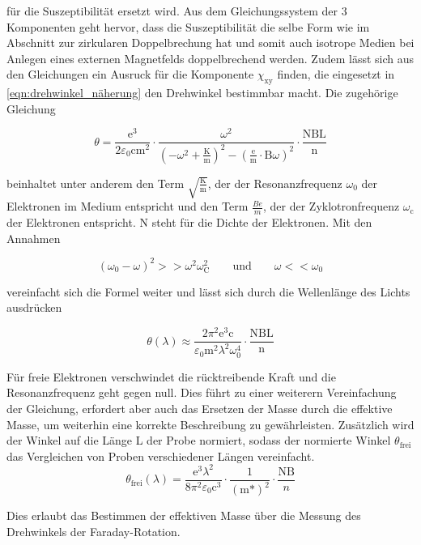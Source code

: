         für die Suszeptibilität ersetzt wird. Aus dem Gleichungssystem der 3 Komponenten geht hervor, dass die Suszeptibilität die selbe Form wie im Abschnitt zur zirkularen Doppelbrechung hat und somit auch 
        isotrope Medien bei Anlegen eines externen Magnetfelds doppelbrechend werden. Zudem lässt sich aus den Gleichungen ein Ausruck für die Komponente $\chi_{\text{xy}}$ finden, die eingesetzt in 
        \ref{eqn:drehwinkel_näherung} den Drehwinkel bestimmbar macht. Die zugehörige Gleichung

        \begin{equation*}
            \theta = \frac{\text{e}^3}{2\varepsilon_0\text{cm}^2} \cdot \frac{\omega^2}{\left(-\omega^2 + \frac{\text{K}}{\text{m}}\right)^2 - \left(\frac{\text{e}}{\text{m}} \cdot \text{B} \omega\right)^2} \cdot \frac{\text{NBL}}{\text{n}}
        \end{equation*}

        beinhaltet unter anderem den Term $\sqrt{\frac{\text{K}}{\text{m}}}$, der der Resonanzfrequenz $\omega_0$ der Elektronen im Medium entspricht und den Term $\frac{Be}{m}$, der der Zyklotronfrequenz 
        $\omega_{\text{c}}$ der Elektronen entspricht. N steht für die Dichte der Elektronen. Mit den Annahmen
        
        \begin{equation*}
            \left(\omega_0 - \omega\right)^2 >> \omega^2 \omega_{\text{C}}^2 \qquad \text{und} \qquad \omega << \omega_0
        \end{equation*}

        vereinfacht sich die Formel weiter und lässt sich durch die Wellenlänge des Lichts ausdrücken

        \begin{equation*}
            \theta(\lambda) \approx \frac{2\pi^2\text{e}^3\text{c}}{\varepsilon_0 \text{m}^2 \lambda^2 \omega_0^4} \cdot \frac{\text{NBL}}{\text{n}}
        \end{equation*}

        Für freie Elektronen verschwindet die rücktreibende Kraft und die Resonanzfrequenz geht gegen null. Dies führt zu einer weiterern Vereinfachung der Gleichung, erfordert aber auch das Ersetzen der Masse
        durch die effektive Masse, um weiterhin eine korrekte Beschreibung zu gewährleisten. Zusätzlich wird der Winkel auf die Länge L der Probe normiert, sodass der normierte Winkel $\theta_{\text{frei}}$
        das Vergleichen von Proben verschiedener Längen vereinfacht.
        \begin{equation}
            \theta_{\text{frei}}(\lambda) = \frac{\text{e}^3 \lambda^2}{8\pi^2\varepsilon_0 \text{c}^3} \cdot \frac{1}{(\text{m*})^2} \cdot \frac{\text{NB}}{n}
            \label{eqn:faraday}
        \end{equation}

        Dies erlaubt das Bestimmen der effektiven Masse über die Messung des Drehwinkels der Faraday-Rotation.



        